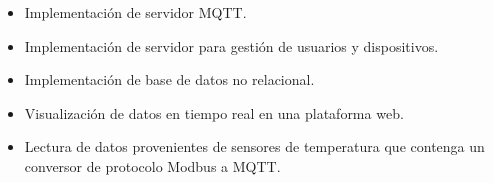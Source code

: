 \begin{itemize}
	\item Implementación de servidor MQTT.
	\item Implementación de servidor para gestión de usuarios y dispositivos.
	\item Implementación de base de datos no relacional. 
	\item Visualización de datos en tiempo real en una plataforma web. 
	\item Lectura de datos provenientes de sensores de temperatura que contenga un conversor de protocolo Modbus a MQTT.
\end{itemize}
